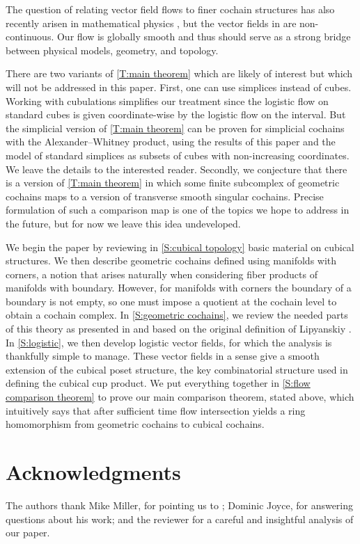 The question of relating vector field flows to finer cochain structures has also recently arisen in mathematical physics \cite{Thor18, Tata20}, but the vector fields in \cite{Tata20} are non-continuous.
Our flow is globally smooth and thus should serve as a strong bridge between physical models, geometry, and topology.

There are two variants of \cref{T:main theorem} which are likely of interest but which will not be addressed in this paper.
First, one can use simplices instead of cubes.
Working with cubulations simplifies our treatment since the logistic flow on standard cubes is given coordinate-wise by the logistic flow on the interval.
But the simplicial version of \cref{T:main theorem} can be proven for simplicial cochains with the Alexander--Whitney product, using the results of this paper and the model of standard simplices as subsets of cubes with non-increasing coordinates.
We leave the details to the interested reader.
Secondly, we conjecture that there is a version of \cref{T:main theorem} in which some finite subcomplex of geometric cochains maps to a version of transverse smooth singular cochains.
Precise formulation of such a comparison map is one of the topics we hope to address in the future, but for now we leave this idea undeveloped.

We begin the paper by reviewing in \cref{S:cubical topology} basic material on cubical structures.
We then describe geometric cochains defined using manifolds with corners, a notion that arises naturally when considering fiber products of manifolds with boundary.
However, for manifolds with corners the boundary of a boundary is not empty, so one must impose a quotient at the cochain level to obtain a cochain complex.
In \cref{S:geometric cochains}, we review the needed parts of this theory as presented in \cite{medina2022foundations} and based on the original definition of Lipyanskiy \cite{Lipy14}.
In \cref{S:logistic}, we then develop logistic vector fields, for which the analysis is thankfully simple to manage.
These vector fields in a sense give a smooth extension of the cubical poset structure, the key combinatorial structure used in defining the cubical cup product.
We put everything together in \cref{S:flow comparison theorem} to prove our main comparison theorem, stated above, which intuitively says that after sufficient time flow intersection yields a ring homomorphism from geometric cochains to cubical cochains.

\section*{Acknowledgments}

The authors thank Mike Miller, for pointing us to \cite{Lipy14}; Dominic Joyce, for answering questions about his work; and the reviewer for a careful and insightful analysis of our paper.